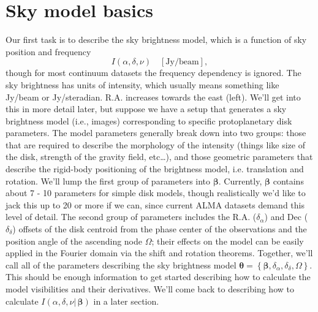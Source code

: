 \documentclass[modern]{aastex62}
\newcommand{\bbeta}{\boldsymbol{\beta}} %
\newcommand{\btheta}{\boldsymbol{\theta}} %
\begin{document}

\section{Sky model basics}
Our first task is to describe the sky brightness model, which is a function of sky position and frequency
\begin{equation}
    I(\alpha, \delta, \nu) \quad [\mathrm{Jy/beam}],
\end{equation}
though for most continuum datasets the frequency dependency is ignored.
The sky brightness has units of intensity, which usually means something like Jy/beam or Jy/steradian. R.A. increases towards the east (left). We'll get into this in more detail later, but suppose we have a setup that generates a sky brightness model (i.e., images) corresponding to specific protoplanetary disk parameters. The model parameters generally break down into two groups: those that are required to describe the morphology of the intensity (things like size of the disk, strength of the gravity field, etc\ldots), and those geometric parameters that describe the rigid-body positioning of the brightness model, i.e. translation and rotation. We'll lump the first group of parameters into $\bbeta$. Currently, $\bbeta$ contains about 7 - 10 parameters for simple disk models, though realistically we'd like to jack this up to 20 or more if we can, since current ALMA datasets demand this level of detail. The second group of parameters includes the R.A. ($\delta_\alpha$) and Dec ($\delta_\delta$) offsets of the disk centroid from the phase center of the observations and the position angle of the ascending node $\Omega$; their effects on the model can be easily applied in the Fourier domain via the shift and rotation theorems. Together, we'll call all of the  parameters describing the sky brightness model $\btheta = \left \{ \bbeta, \delta_\alpha, \delta_\delta, \Omega \right \}$. This should be enough information to get started describing how to calculate the model visibilities and their derivatives. We'll come back to describing how to calculate $I(\alpha, \delta, \nu |\, \bbeta)$ in a later section.  
\end{document}

